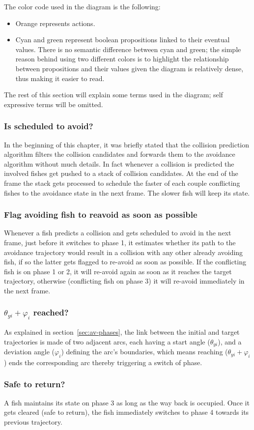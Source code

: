 The color code used in the diagram is the following:
\begin{itemize}
\item Orange represents actions.
\item Cyan and green represent boolean propositions linked to their eventual values. There is no semantic difference between cyan and green; the simple reason behind using two different colors is to highlight the relationship between propositions and their values given the diagram is relatively dense, thus making it easier to read.
\end{itemize}

The rest of this section will explain some terms used in the diagram; self expressive terms will be omitted.

\subsubsection{Is scheduled to avoid?}
In the beginning of this chapter, it was briefly stated that the collision prediction algorithm filters the collision candidates and forwards them to the avoidance algorithm without much details. In fact whenever a collision is predicted the involved fishes get pushed to a stack of collision candidates. At the end of the frame the stack gets processed to schedule the faster of each couple conflicting fishes to the avoidance state in the next frame. The slower fish will keep its state.

\subsubsection{Flag avoiding fish to reavoid as soon as possible}
Whenever a fish predicts a collision and gets scheduled to avoid in the next frame, just before it switches to phase 1, it estimates whether its path to the avoidance trajectory would result in a collision with any other already avoiding fish, if so the latter gets flagged to re-avoid as soon as possible. If the conflicting fish is on phase 1 or 2, it will re-avoid again as soon as it reaches the target trajectory, otherwise (conflicting fish on phase 3) it will re-avoid immediately in the next frame.

\subsubsection{$\theta_{yi} + \varphi_i$ reached?}
As explained in section~\ref{sec:av-phases}, the link between the initial and target trajectories is made of two adjacent arcs, each having a start angle ($\theta_{yi}$), and a deviation angle ($\varphi_i$) defining the arc's boundaries, which means reaching ($\theta_{yi} + \varphi_i$) ends the corresponding arc thereby triggering a switch of phase.

\subsubsection{Safe to return?}
A fish maintains its state on phase 3 as long as the way back is occupied. Once it gets cleared (safe to return), the fish immediately switches to phase 4 towards its previous trajectory.

\newpage